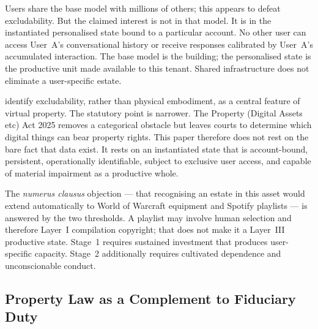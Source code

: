 Users share the base model with millions of others; this appears to defeat excludability. But the claimed interest is not in that model. It is in the instantiated personalised state bound to a particular account. No other user can access User~A's conversational history or receive responses calibrated by User~A's accumulated interaction. The base model is the building; the personalised state is the productive unit made available to this tenant. Shared infrastructure does not eliminate a user-specific estate.

\textcite{fairfield2005virtual,fairfield2017owned} identify excludability, rather than physical embodiment, as a central feature of virtual property. The statutory point is narrower. The Property (Digital Assets etc) Act 2025 removes a categorical obstacle but leaves courts to determine which digital things can bear property rights. This paper therefore does not rest on the bare fact that data exist. It rests on an instantiated state that is account-bound, persistent, operationally identifiable, subject to exclusive user access, and capable of material impairment as a productive whole.

The \emph{numerus clausus} objection --- that recognising an estate in this asset would extend automatically to World of Warcraft equipment and Spotify playlists --- is answered by the two thresholds. A playlist may involve human selection and therefore Layer~I compilation copyright; that does not make it a Layer~III productive state. Stage~1 requires sustained investment that produces user-specific capacity. Stage~2 additionally requires cultivated dependence and unconscionable conduct.

\subsection{Property Law as a Complement to Fiduciary Duty}
\label{sec:fiduciary-alone}


